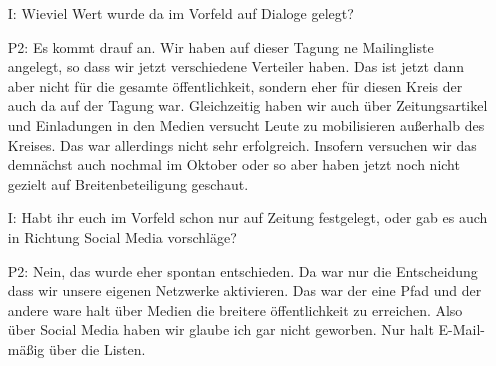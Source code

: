 \begin{itemize}
    \item[I:] Wieviel Wert wurde da im Vorfeld auf Dialoge gelegt?
    \item[P2:] Es kommt drauf an. Wir haben auf dieser Tagung ne Mailingliste angelegt, so dass wir jetzt verschiedene Verteiler haben. Das ist jetzt dann aber nicht f{\"u}r die gesamte {\"o}ffentlichkeit, sondern eher f{\"u}r diesen Kreis der auch da auf der Tagung war. Gleichzeitig haben wir auch {\"u}ber Zeitungsartikel und Einladungen in den Medien versucht Leute zu mobilisieren au{\ss}erhalb des Kreises. Das war allerdings nicht sehr erfolgreich. Insofern versuchen wir das demn{\"a}chst auch nochmal im Oktober oder so aber haben jetzt noch nicht gezielt auf Breitenbeteiligung geschaut.
    \item[I:] Habt ihr euch im Vorfeld schon nur auf Zeitung festgelegt, oder gab es auch in Richtung Social Media vorschl{\"a}ge?
    \item[P2:] Nein, das wurde eher spontan entschieden. Da war nur die Entscheidung dass wir unsere eigenen Netzwerke aktivieren. Das war der eine Pfad und der andere ware halt {\"u}ber Medien die breitere {\"o}ffentlichkeit zu erreichen. Also {\"u}ber Social Media haben wir glaube ich gar nicht geworben. Nur halt E-Mail-m{\"a}{\ss}ig {\"u}ber die Listen.
\end{itemize}

